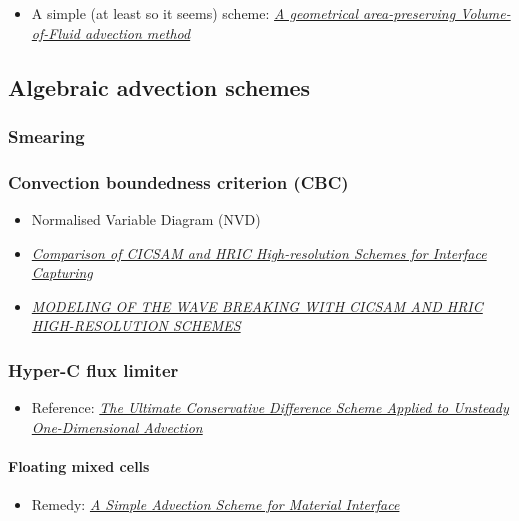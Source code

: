 \documentclass[a4paper]{report}
\begin{document}
\begin{itemize}
    \item A simple (at least so it seems) scheme: \textit{\href{http://www.lmm.jussieu.fr/~zaleski/nota02.pdf}{A geometrical area-preserving Volume-of-Fluid advection method}}
\end{itemize}

\subsection{Algebraic advection schemes}

\subsubsection{Smearing}

\subsubsection{Convection boundedness criterion (CBC)}

\begin{itemize}
    \item Normalised Variable Diagram (NVD)
    \item \textit{\href{http://warminski.pollub.plwww.ptmts.org.pl/Waclaw-Koron-2-08.pdf}{Comparison of CICSAM and HRIC High-resolution Schemes for Interface Capturing}}
    \item \textit{\href{http://proceedings.fyper.com/eccomascfd2006/documents/85.pdf}{MODELING OF THE WAVE BREAKING WITH CICSAM AND HRIC HIGH-RESOLUTION SCHEMES}}
\end{itemize}

\subsubsection{Hyper-C flux limiter}

\begin{itemize}
    \item Reference: \textit{\href{http://www.water.tkk.fi/wr/kurssit/Yhd-12.112/TVD1.pdf}{The Ultimate Conservative Difference Scheme Applied to Unsteady One-Dimensional Advection}}
\end{itemize}

\paragraph{Floating mixed cells}

\begin{itemize}
    \item Remedy: \textit{\href{https://e-reports-ext.llnl.gov/pdf/245038.pdf}{A Simple Advection Scheme for Material Interface}}
\end{itemize}
\end{document}
